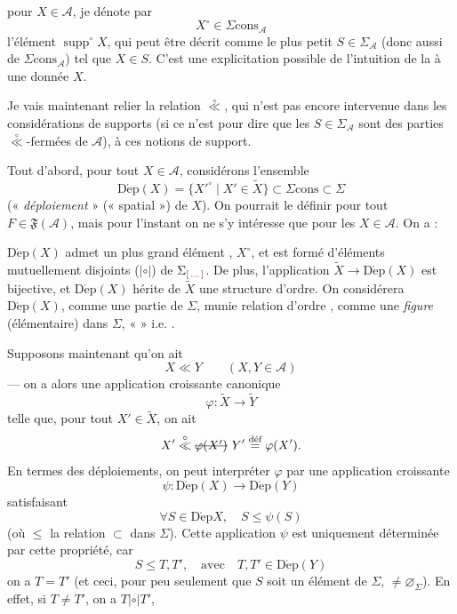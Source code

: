 \documentclass[11pt,a4paper]{article}
\begin{document}
 
pour $X \in \mathcal{A}$, je dénote par
\[
  X^{\circ} \in \Sigma\mathrm{cons}_{\mathcal{A}}
\]
l'élément \struck{\ill{}} 
$\operatorname{supp}^{\circ} X$, qui peut être décrit comme le plus petit
$S \in \Sigma_{\mathcal{A}}$ (donc aussi de $\Sigma\mathrm{cons}_{\mathcal{A}}$) tel que $X \in S$. C'est une
explicitation possible de l'intuition de la \emph{}  à une  donnée $X$.


Je vais maintenant relier la relation  $\overset{\circ}{\ll}$, qui n'est pas encore
intervenue dans les considérations de supports (si ce n'est pour dire que les $S \in \Sigma_{\mathcal{A}}$ sont des parties $\overset{\circ}{\ll}$-fermées de $\mathcal{A}$), à ces notions de
support.

Tout d'abord, pour tout $X \in \mathcal{A}$, considérons 
l'ensemble
\[
  \operatorname{D\acute{e}p}(X) = \{ X'^{\circ} \mid X' \in \widetilde{X} \}
  \subset \Sigma\mathrm{cons} \subset \Sigma
\]
(« \emph{déploiement} »  (« spatial ») de $X$). On pourrait le
définir pour tout $F \in \mathfrak{F}(\mathcal{A})$, mais pour l'instant on ne
s'y intéresse que pour les $X \in \mathcal{A}$. On a :

$\operatorname{D\acute{e}p}(X)$ admet un plus grand élément
\add{$\neq \varnothing_{\Sigma}$}, $X^{\circ}$, et est formé d'éléments
mutuellement disjoints ($\mathrel{|\circ|}$) de
$\Sigma_{\ill{}}$. De plus, l'application
$\widetilde{X} \to \operatorname{D\acute{e}p}(X)$ est bijective, et
$\operatorname{D\acute{e}p}(X)$ hérite de $\widetilde{X}$ une structure
d'ordre. On considérera  $\operatorname{D\acute{e}p}(X)$,
comme une partie de $\Sigma$, munie   relation
d'ordre \ill{}, comme une \emph{figure} (élémentaire) 
dans $\Sigma$, « \emph{} » i.e. \ill{} \ill{}
.


Supposons maintenant qu'on ait
\[
  X \ll Y \qquad (X, Y \in \mathcal{A})
\]
--- on a alors une application croissante canonique
\[
  \varphi : \widetilde{X} \longrightarrow \widetilde{Y}
\]
telle que, pour tout $X' \in \widetilde{X}$, on ait
\[
  X' \overset{\circ}{\ll} \text{\struck{$\varphi(X')$}}\
  Y' \overset{\text{déf}}{=} \varphi(X') .
\]
En termes des déploiements, on peut interpréter $\varphi$ par une application
croissante
\[
  \psi : \operatorname{D\acute{e}p}(X) \longrightarrow \operatorname{D\acute{e}p}(Y)
\]
satisfaisant
\[
  \forall S \in \operatorname{D\acute{e}p} X, \quad S \leq \psi(S)
\]
(où  $\leq$ la relation $\subset$ dans $\Sigma$). Cette application $\psi$ est
uniquement déterminée par cette propriété, car \struck{\uncertain{si on a}}
\add{\uncertain{si}}
\[
  S \leq T, T', \quad \text{avec} \quad
  T, T' \in \operatorname{D\acute{e}p}(Y)
\]
on a $T = T'$ (et ceci, pour peu seulement que $S$ soit un élément de
$\Sigma$, $\neq \varnothing_{\Sigma}$). En effet, si $T \neq T'$, on a
$T \mathrel{|\circ|} T'$,
\end{document}
